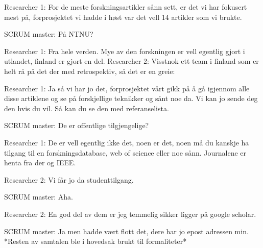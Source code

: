 Researcher 1: For de meste forskningsartikler sånn sett, er det vi har fokusert mest på, forprosjektet vi hadde i høst var det vell 14 artikler som vi brukte.

SCRUM master: På NTNU?

Researcher 1: Fra hele verden. Mye av den forskningen er vell egentlig gjort i utlandet, finland er gjort en del.
Researcher 2: Visstnok ett team i finland som er helt rå på det der med retrospektiv, så det er en greie:

Researcher 1: Ja så vi har jo det, forprosjektet vårt gikk på å gå igjennom alle disse artiklene og se på forskjellige teknikker og sånt noe da. Vi kan jo sende deg den hvis du vil. Så kan du se den med referanselista.

SCRUM master: De er offentlige tilgjengelige?

Researcher 1: De er vell egentlig ikke det, noen er det, noen må du kanskje ha tilgang til en forskningsdatabase, web of science eller noe sånn. Journalene er henta fra der og IEEE.

Researcher 2: Vi får jo da studenttilgang.

SCRUM master: Aha.

Researcher 2: En god del av dem er jeg temmelig sikker ligger på google scholar. 

SCRUM master: Ja men hadde vært flott det, dere har jo epost adressen min.
*Resten av samtalen ble i hovedsak brukt til formaliteter*

